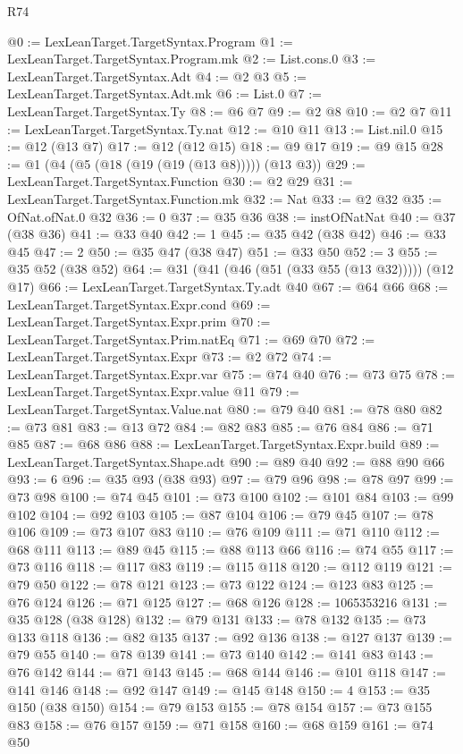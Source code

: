 \begin{lexlean}{R74}
\begin{coremodule}
@0 := LexLeanTarget.TargetSyntax.Program
@1 := LexLeanTarget.TargetSyntax.Program.mk
@2 := List.cons.{0}
@3 := LexLeanTarget.TargetSyntax.Adt
@4 := @2 @3
@5 := LexLeanTarget.TargetSyntax.Adt.mk
@6 := List.{0}
@7 := LexLeanTarget.TargetSyntax.Ty
@8 := @6 @7
@9 := @2 @8
@10 := @2 @7
@11 := LexLeanTarget.TargetSyntax.Ty.nat
@12 := @10 @11
@13 := List.nil.{0}
@15 := @12 (@13 @7)
@17 := @12 (@12 @15)
@18 := @9 @17
@19 := @9 @15
@28 := @1 (@4 (@5 (@18 (@19 (@19 (@13 @8))))) (@13 @3))
@29 := LexLeanTarget.TargetSyntax.Function
@30 := @2 @29
@31 := LexLeanTarget.TargetSyntax.Function.mk
@32 := Nat
@33 := @2 @32
@35 := OfNat.ofNat.{0} @32
@36 := 0
@37 := @35 @36
@38 := instOfNatNat
@40 := @37 (@38 @36)
@41 := @33 @40
@42 := 1
@45 := @35 @42 (@38 @42)
@46 := @33 @45
@47 := 2
@50 := @35 @47 (@38 @47)
@51 := @33 @50
@52 := 3
@55 := @35 @52 (@38 @52)
@64 := @31 (@41 (@46 (@51 (@33 @55 (@13 @32))))) (@12 @17)
@66 := LexLeanTarget.TargetSyntax.Ty.adt @40
@67 := @64 @66
@68 := LexLeanTarget.TargetSyntax.Expr.cond
@69 := LexLeanTarget.TargetSyntax.Expr.prim
@70 := LexLeanTarget.TargetSyntax.Prim.natEq
@71 := @69 @70
@72 := LexLeanTarget.TargetSyntax.Expr
@73 := @2 @72
@74 := LexLeanTarget.TargetSyntax.Expr.var
@75 := @74 @40
@76 := @73 @75
@78 := LexLeanTarget.TargetSyntax.Expr.value @11
@79 := LexLeanTarget.TargetSyntax.Value.nat
@80 := @79 @40
@81 := @78 @80
@82 := @73 @81
@83 := @13 @72
@84 := @82 @83
@85 := @76 @84
@86 := @71 @85
@87 := @68 @86
@88 := LexLeanTarget.TargetSyntax.Expr.build
@89 := LexLeanTarget.TargetSyntax.Shape.adt
@90 := @89 @40
@92 := @88 @90 @66
@93 := 6
@96 := @35 @93 (@38 @93)
@97 := @79 @96
@98 := @78 @97
@99 := @73 @98
@100 := @74 @45
@101 := @73 @100
@102 := @101 @84
@103 := @99 @102
@104 := @92 @103
@105 := @87 @104
@106 := @79 @45
@107 := @78 @106
@109 := @73 @107 @83
@110 := @76 @109
@111 := @71 @110
@112 := @68 @111
@113 := @89 @45
@115 := @88 @113 @66
@116 := @74 @55
@117 := @73 @116
@118 := @117 @83
@119 := @115 @118
@120 := @112 @119
@121 := @79 @50
@122 := @78 @121
@123 := @73 @122
@124 := @123 @83
@125 := @76 @124
@126 := @71 @125
@127 := @68 @126
@128 := 1065353216
@131 := @35 @128 (@38 @128)
@132 := @79 @131
@133 := @78 @132
@135 := @73 @133 @118
@136 := @82 @135
@137 := @92 @136
@138 := @127 @137
@139 := @79 @55
@140 := @78 @139
@141 := @73 @140
@142 := @141 @83
@143 := @76 @142
@144 := @71 @143
@145 := @68 @144
@146 := @101 @118
@147 := @141 @146
@148 := @92 @147
@149 := @145 @148
@150 := 4
@153 := @35 @150 (@38 @150)
@154 := @79 @153
@155 := @78 @154
@157 := @73 @155 @83
@158 := @76 @157
@159 := @71 @158
@160 := @68 @159
@161 := @74 @50

\end{coremodule}
\end{lexlean}
